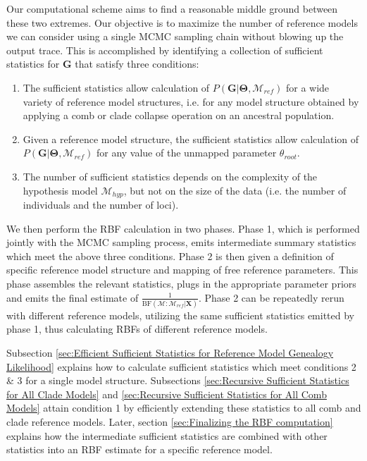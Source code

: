 \documentclass[11pt]{article}
\newcommand{\vect}[1]{\boldsymbol{\mathbf{#1}}}
\newcommand{\X}{\vect{X}}
\newcommand{\M}{\mathcal{M}}
\newcommand{\G}{\vect{G}}
\newcommand{\T}{\vect{\Theta}}
\newcommand{\Mref}{\M_{ref}}
\newcommand{\Mhyp}{\M_{hyp}}
\newcommand{\rbf}{\text{BF}}
\newcommand{\1}{\mathbbm{1}}
\begin{document}
Our computational scheme aims to find a reasonable middle ground between these two extremes.
%
Our objective is to maximize the number of reference models we can consider using a single MCMC sampling chain without blowing up the output trace.
%
This is accomplished by identifying a collection of sufficient statistics for $\G$ that satisfy three conditions:
%
\begin{enumerate}
 \item The sufficient statistics allow calculation of $P(\G|\T,\Mref)$ for a wide variety of reference model structures, i.e. for any model structure obtained by applying a comb or clade collapse operation on an ancestral population.
 \item Given a reference model structure, the sufficient statistics allow calculation of $P(\G|\T,\Mref)$ for any value of the unmapped parameter $\theta_{root}$.
 \item The number of sufficient statistics depends on the complexity of the hypothesis model $\Mhyp$, but not on the size of the data (i.e. the number of individuals and the number of loci).
\end{enumerate}
%

We then perform the RBF calculation in two phases. 
%
Phase 1, which is performed jointly with the MCMC sampling process, emits intermediate summary statistics which meet the above three conditions. 
%
Phase 2 is then given a definition of specific reference model structure and mapping of free reference parameters. This phase assembles the relevant statistics, plugs in the appropriate parameter priors and emits the final estimate of $ \frac{1}{\rbf(\M:\Mref|\X)}$. 
%
Phase 2 can be repeatedly rerun with different reference models, utilizing the same sufficient statistics emitted by phase 1, thus calculating RBFs of different reference models.

Subsection \ref{sec:Efficient Sufficient Statistics for Reference Model Genealogy Likelihood} explains how to calculate sufficient statistics which meet conditions 2 \& 3 for a single model structure.
%
Subsections \ref{sec:Recursive Sufficient Statistics for All Clade Models} and \ref{sec:Recursive Sufficient Statistics for All Comb Models} attain condition 1 by efficiently extending these statistics to all comb and clade reference models.
%
Later, section \ref{sec:Finalizing the RBF computation} explains how the intermediate sufficient statistics are combined with other statistics into an RBF estimate for a specific reference model.
\end{document}
